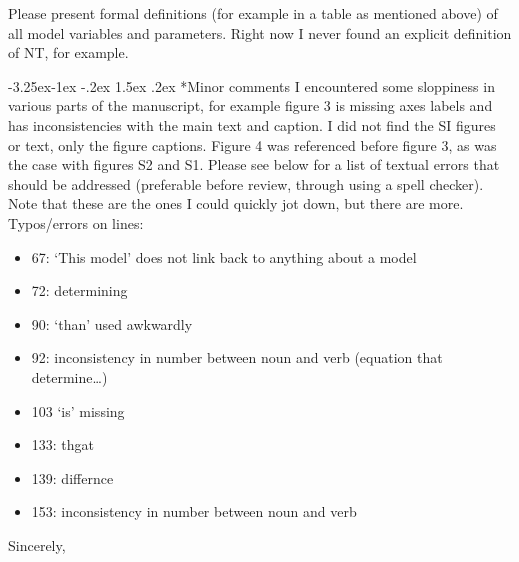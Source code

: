 \documentclass[ucm,12pt]{ucletter}
\makeatletter
\newcounter{section}
\newcounter{subsection}[section]
\newcommand\subsection{\@startsection{subsection}{2}{\z@}%
                                     {-3.25ex\@plus -1ex \@minus -.2ex}%
                                     {1.5ex \@plus .2ex}%
                                     {\normalfont\large\bfseries}}
\makeatother
\begin{document}
\begin{letter}
Please present formal definitions (for example in a table as mentioned above) of all model variables and parameters. Right now I never found an explicit definition of NT, for example.


\subsection*{Minor comments}
I encountered some sloppiness in various parts of the manuscript, for example figure 3 is missing axes labels and has inconsistencies with the main text and caption. I did not find the SI figures or text, only the figure captions. Figure 4 was referenced before figure 3, as was the case with figures S2 and S1. Please see below for a list of textual errors that should be addressed (preferable before review, through using a spell checker). Note that these are the ones I could quickly jot down, but there are more.
Typos/errors on lines:
\begin{itemize}
\item 67:   ‘This model’ does not link back to anything about a model
\item 72:   determining
\item 90:   ‘than’ used awkwardly
\item 92:   inconsistency in number between noun and verb (equation that determine…)
\item 103  ‘is’ missing
\item 133: thgat
\item 139: differnce
\item 153:  inconsistency in number between noun and verb
\end{itemize}


\vspace{5mm}

\singlespacing
\closing{Sincerely,\\
\\
}

\end{letter}
\end{document}
